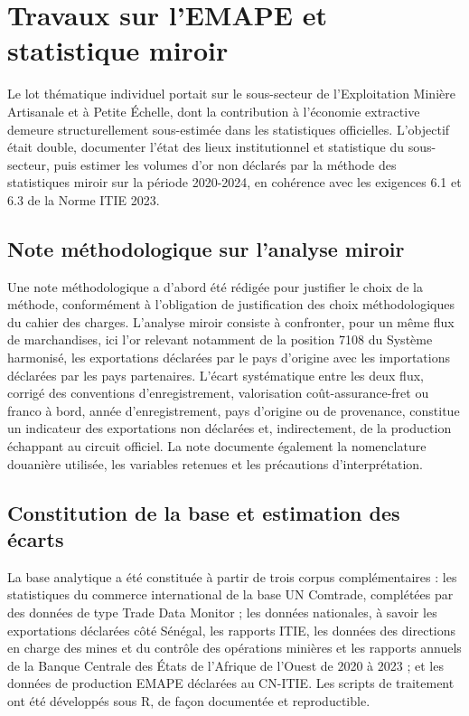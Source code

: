 \documentclass[12pt, a4paper]{article}
\begin{document}
\section{Travaux sur l'EMAPE et statistique miroir}

Le lot thématique individuel portait sur le sous-secteur de l'Exploitation
Minière Artisanale et à Petite Échelle, dont la contribution à l'économie
extractive demeure structurellement sous-estimée dans les statistiques
officielles. L'objectif était double, documenter l'état des lieux
institutionnel et statistique du sous-secteur, puis estimer les volumes d'or
non déclarés par la méthode des statistiques miroir sur la période 2020-2024,
en cohérence avec les exigences 6.1 et 6.3 de la Norme ITIE 2023.

\subsection{Note méthodologique sur l'analyse miroir}

Une note méthodologique a d'abord été rédigée pour justifier le choix de la
méthode, conformément à l'obligation de justification des choix
méthodologiques du cahier des charges. L'analyse miroir consiste à confronter,
pour un même flux de marchandises, ici l'or relevant notamment de la position
7108 du Système harmonisé, les
exportations déclarées par le pays d'origine avec les importations déclarées
par les pays partenaires. L'écart systématique entre les deux flux, corrigé
des conventions d'enregistrement, valorisation coût-assurance-fret ou franco à
bord, année d'enregistrement, pays d'origine ou de provenance, constitue un indicateur des exportations non
déclarées et, indirectement, de la production échappant au circuit officiel.
La note documente également la nomenclature douanière utilisée, les variables
retenues et les précautions d'interprétation.

\subsection{Constitution de la base et estimation des écarts}

La base analytique a été constituée à partir de trois corpus complémentaires :
les statistiques du commerce international de la base UN Comtrade, complétées
par des données de type Trade Data Monitor ; les données nationales, à savoir
les exportations déclarées côté Sénégal, les rapports ITIE, les données des
directions en charge des mines et du contrôle des opérations minières et les
rapports annuels de la Banque Centrale des États de l'Afrique de l'Ouest de
2020 à 2023 ; et les données de production EMAPE déclarées au CN-ITIE.
Les scripts de traitement ont été développés sous R, de façon documentée et
reproductible.
\end{document}
